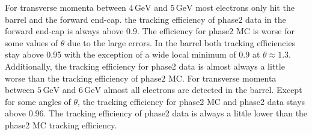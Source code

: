 \documentclass[a4paper,11pt,twosided,final,german,openbib,pdftex,listof=totoc,bibliography=totoc]{scrbook}
\begin{document}
For transverse momenta between $4\,\textrm{GeV}$ and $5\,\textrm{GeV}$ most electrons only hit the barrel and the forward end-cap. the tracking efficiency of phase2 data in the forward end-cap is always above 0.9. The efficiency for phase2 MC is worse for some values of $\theta$ due to the large errors. In the barrel both tracking efficiencies stay above 0.95 with the exception of a wide local minimum of 0.9 at $\theta \approx 1.3$. Additionally, the tracking efficiency for phase2 data is almost always a little worse than the tracking efficiency of phase2 MC.
For transverse momenta between $5\,\textrm{GeV}$ and $6\,\textrm{GeV}$ almost all electrons are detected in the barrel. Except for some angles of $\theta$, the tracking efficiency for phase2 MC and phase2 data stays above 0.96. The tracking efficiency of phase2 data is always a little lower than the phase2 MC tracking efficiency. 
\end{document}
